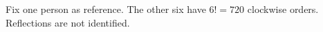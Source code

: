 Fix one person as reference. The other six have $6!=\boxed{720}$ clockwise orders. Reflections are not identified.
